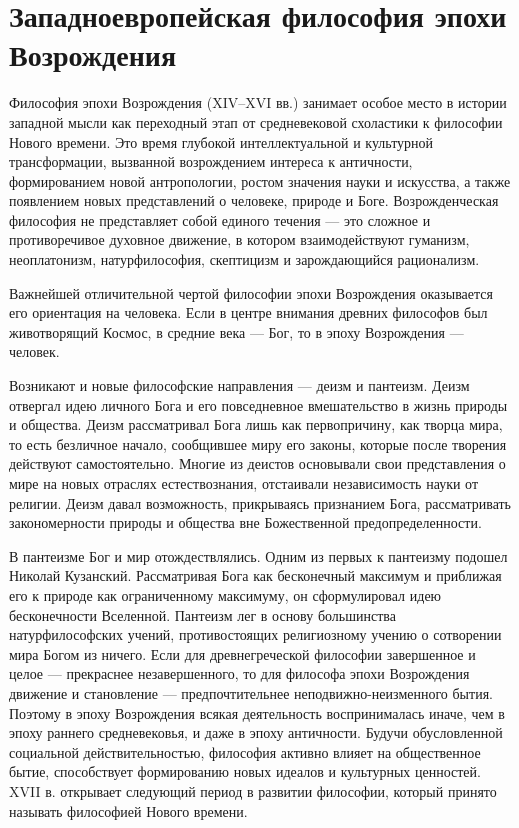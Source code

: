 \documentclass[12pt,a4paper]{article}
\begin{document}
	\section{Западноевропейская философия эпохи Возрождения~\checkmark}
	Философия эпохи Возрождения (XIV–XVI вв.) занимает особое место в истории западной мысли как переходный этап от средневековой схоластики к философии Нового времени. Это время глубокой интеллектуальной и культурной трансформации, вызванной возрождением интереса к античности, формированием новой антропологии, ростом значения науки и искусства, а также появлением новых представлений о человеке, природе и Боге. Возрожденческая философия не представляет собой единого течения — это сложное и противоречивое духовное движение, в котором взаимодействуют гуманизм, неоплатонизм, натурфилософия, скептицизм и зарождающийся рационализм.
	
	Важнейшей отличительной чертой философии эпохи Возрождения оказывается его ориентация на человека. Если в центре внимания древних философов был животворящий Космос, в средние века — Бог, то в эпоху Возрождения — человек.
	
	Возникают и новые философские направления — деизм и панте­изм. Деизм отвергал идею личного Бога и его повседневное вмеша­тельство в жизнь природы и общества. Деизм рассматривал Бога лишь как первопричину, как творца мира, то есть безличное начало, сооб­щившее миру его законы, которые после творения действуют само­стоятельно. Многие из деистов основывали свои представления о ми­ре на новых отраслях естествознания, отстаивали независимость нау­ки от религии. Деизм давал возможность, прикрываясь признанием Бога, рассматривать закономерности природы и общества вне Боже­ственной предопределенности.
	
	В пантеизме Бог и мир отождествлялись. Одним из первых к панте­изму подошел Николай Кузанский. Рассматривая Бога как бесконеч­ный максимум и приближая его к природе как ограниченному макси­муму, он сформулировал идею бесконечности Вселенной. Пантеизм лег в основу большинства натурфилософских учений, противостоящих ре­лигиозному учению о сотворении мира Богом из ничего. Если для древнегреческой фило­софии завершенное и целое — прекраснее незавершенного, то для фи­лософа эпохи Возрождения движение и становление — предпочтитель­нее неподвижно-неизменного бытия. Поэтому в эпоху Возрождения всякая деятельность воспринималась иначе, чем в эпоху раннего средневековья, и даже в эпоху античности. Будучи обусловленной социальной действительностью, фи­лософия активно влияет на общественное бытие, способствует фор­мированию новых идеалов и культурных ценностей. XVII в. открыва­ет следующий период в развитии философии, который принято назы­вать философией Нового времени.
	
\end{document}

